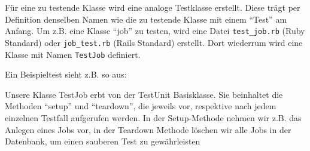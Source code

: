 Für eine zu testende Klasse wird eine analoge Testklasse erstellt. Diese trägt per Definition denselben Namen wie die zu testende Klasse mit einem "`Test"' am Anfang. Um z.B. eine Klasse "`job"' zu testen, wird eine Datei \texttt{test\_job.rb} (Ruby Standard) oder \texttt{job\_test.rb} (Rails Standard) erstellt. Dort wiederrum wird eine Klasse mit Namen \texttt{TestJob} definiert. 

Ein Beispieltest sieht z.B. so aus:
\begin{ruby}[label=Testen mit Test::Unit]
\PY{o}{[}      \PY{o}{]}
 

   
   
      
  
   
  
   
       
     
    
       
\end{ruby}

Unsere Klasse TestJob erbt von der TestUnit Basisklasse. Sie beinhaltet die Methoden "`setup"' und "`teardown"', die jeweils vor, respektive nach jedem einzelnen Testfall aufgerufen werden.
In der Setup-Methode nehmen wir z.B. das Anlegen eines Jobs vor, in der Teardown Methode löschen wir alle Jobs in der Datenbank, um einen sauberen Test zu gewährleisten

